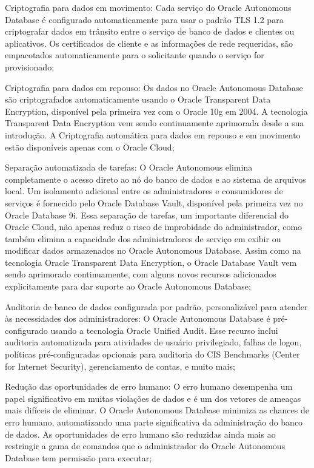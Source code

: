 \begin{alineas}

\item Criptografia para dados em movimento:  Cada serviço do Oracle Autonomous Database é configurado automaticamente para usar o padrão TLS 1.2 para criptografar dados em trânsito entre o serviço de banco de dados e clientes ou aplicativos. Os certificados de cliente e as informações de rede requeridas, são empacotados automaticamente para o solicitante quando o serviço for provisionado;

\item Criptografia para dados em repouso: Os dados no Oracle Autonomous Database são criptografados automaticamente usando o Oracle Transparent Data Encryption, disponível pela primeira vez com o Oracle 10g em 2004. A tecnologia Transparent Data Encryption vem sendo continuamente aprimorada desde a sua introdução. A Criptografia automática para dados em repouso e em movimento estão disponíveis apenas com o Oracle Cloud;

\item Separação automatizada de tarefas: O Oracle Autonomous elimina completamente o acesso direto ao nó do banco de dados e ao sistema de arquivos local. Um isolamento adicional entre os administradores e consumidores de serviços é fornecido pelo Oracle Database Vault, disponível pela primeira vez no Oracle Database 9i. Essa separação de tarefas, um importante diferencial do Oracle Cloud, não apenas reduz o risco de improbidade do administrador, como também elimina a capacidade dos administradores de serviço em exibir ou modificar dados armazenados no Oracle Autonomous Database. Assim como na tecnologia Oracle Transparent Data Encryption, o Oracle Database Vault vem sendo  aprimorado continuamente, com alguns novos recursos adicionados explicitamente para dar suporte ao Oracle Autonomous Database;

\item Auditoria de banco de dados configurada por padrão, personalizável para atender às necessidades dos administradores: O Oracle Autonomous Database é pré-configurado usando a tecnologia Oracle Unified Audit. Esse recurso inclui auditoria automatizada para atividades de usuário privilegiado, falhas de logon, políticas pré-configuradas opcionais para auditoria do CIS Benchmarks (Center for Internet Security), gerenciamento de contas, e muito mais;

\item Redução das oportunidades de erro humano: O erro humano desempenha um papel significativo em muitas violações de dados e é um dos vetores de ameaças mais difíceis de eliminar. O Oracle Autonomous Database minimiza as chances de erro humano, automatizando uma parte significativa da administração do banco de dados. As oportunidades de erro humano são reduzidas ainda mais ao restringir a gama de comandos que o administrador do Oracle Autonomous Database tem permissão para executar;


\end{alineas}
